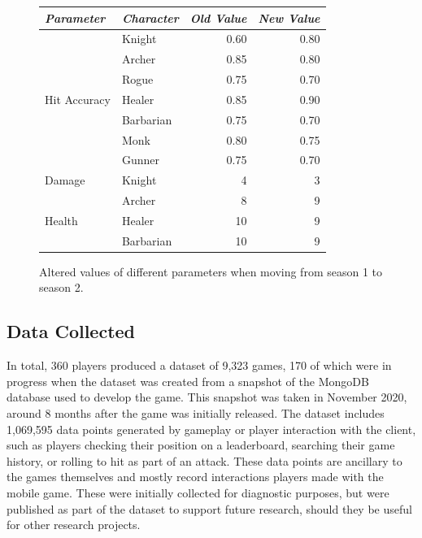 \begin{figure}[h]
  \centering
  \begin{tabular}{@{}l l r r@{}@{}}
    \toprule
    \emph{Parameter} & \emph{Character} & \emph{Old Value} & \emph{New Value} \\
    \midrule
    \multirow{7}{*}{Hit Accuracy} & Knight    & 0.60 & 0.80 \\
                                  & Archer    & 0.85 & 0.80 \\
                                  & Rogue     & 0.75 & 0.70 \\
                                  & Healer    & 0.85 & 0.90 \\
                                  & Barbarian & 0.75 & 0.70 \\
                                  & Monk      & 0.80 & 0.75 \\
                                  & Gunner    & 0.75 & 0.70 \\
    \midrule
    \multirow{1}{*}{Damage}       & Knight    & 4    & 3    \\
    \midrule
    \multirow{3}{*}{Health}       & Archer    & 8    & 9    \\
                                  & Healer    & 10   & 9    \\
                                  & Barbarian & 10   & 9    \\
    \bottomrule
  \end{tabular}
  \caption{Altered values of different parameters when moving from season 1 to season 2.}
  \label{fig:changes_between_seasons}
\end{figure}


\subsection{Data Collected}
\label{sec:rpglite_data_discussed}

In total, 360 players produced a dataset of 9,323 games, 170 of which were in
progress when the dataset was created from a snapshot of the MongoDB database
used to develop the game. This snapshot was taken in November 2020, around 8
months after the game was initially released. The dataset includes 1,069,595
data points generated by gameplay or player interaction with the client, such as
players checking their position on a leaderboard, searching their game history,
or rolling to hit as part of an attack. These data points are ancillary to the
games themselves and mostly record interactions players made with the mobile
game. These were initially collected for diagnostic purposes, but were published
as part of the dataset to support future research, should they be useful for
other research projects.

